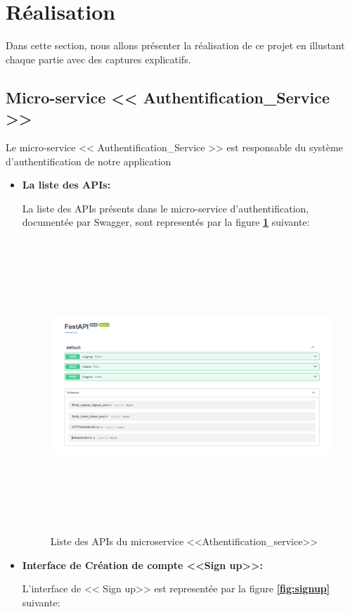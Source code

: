 \section{Réalisation}
\par Dans cette section, nous allons présenter la réalisation de ce projet en illustant chaque partie avec des captures explicatifs.
\subsection{Micro-service << Authentification\_Service >>}
\par Le micro-service << Authentification\_Service >> est responsable du système d'authentification de notre application 
\begin{itemize}
    \item \textbf{La liste des APIs:}
        \par La liste des APIs présents dans le micro-service d'authentification, documentée par Swagger, sont representés par la figure \textbf{\ref{fig:apiAuth}} suivante:
        \begin{figure}[H]
            \centering
            \includegraphics[width =1\linewidth, height=11cm]{img/captures/auth_apis.PNG}
            \caption{Liste des APIs du microservice <<Athentification\_service>> }
                \label{fig:apiAuth}
        \end{figure}
        \item \textbf{Interface de Création de compte <<Sign up>>:}
        \par L'interface de << Sign up>> est representée par la figure \textbf{\ref{fig:signup}} suivante:

\end{itemize}
